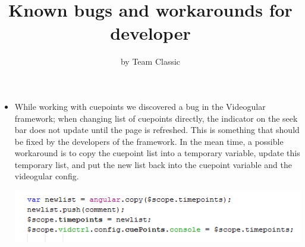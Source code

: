 \documentclass{article}
\title{Known bugs and workarounds for developer}
\author{by Team Classic}
\date{}
\begin{document}
\maketitle

\begin{itemize}
\item While working with cuepoints we discovered a bug in the Videogular framework; when changing list of cuepoints directly, the indicator on the seek bar does not update until the page is refreshed. This is something that should be fixed by the developers of the framework. In the mean time, a possible workaround is to copy the cuepoint list into a temporary variable, update this temporary list, and put the new list back into the cuepoint variable and the videogular config.

\includegraphics{videogular-bug.png}

\end{itemize}
\end{document}
